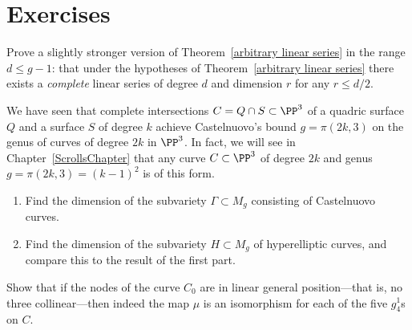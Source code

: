 %


\section{Exercises}

\begin{exercise}
Prove a slightly stronger version of Theorem~\ref{arbitrary linear series} in the range $d \leq g-1$: that under the hypotheses of Theorem~\ref{arbitrary linear series} there exists a \emph{complete} linear series of degree $d$ and dimension $r$ for any $r \leq d/2$.
\end{exercise}

\begin{exercise}\label{rarity of Castelnuovo}
We have seen that complete intersections $C = Q \cap S \subset \PP^3$ of a quadric surface $Q$ and a surface $S$ of degree $k$ achieve Castelnuovo's bound $g = \pi(2k, 3)$ on the genus of curves of degree $2k$ in $\PP^3$. In fact, we will see in Chapter~\ref{ScrollsChapter} that any curve $C \subset \PP^3$ of degree $2k$ and genus $g = \pi(2k, 3) = (k-1)^2$ is of this form.
\begin{enumerate}
\item Find the dimension of the subvariety $\Gamma \subset M_g$ consisting of Castelnuovo curves.
\item Find the dimension of the subvariety $H \subset M_g$ of hyperelliptic curves, and compare this to the result of the first part.
\end{enumerate}
\end{exercise}


\begin{exercise}
Show that if the nodes of the curve $C_0$ are in linear general position---that is, no three collinear---then indeed the map $\mu$ is an isomorphism for each of the five $g^1_4$s on $C$.
\end{exercise}

